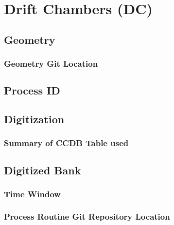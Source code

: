 \section{Drift Chambers (DC)}


\subsection{Geometry}

\subsubsection{Geometry Git Location}

\subsection{Process ID}

\subsection{Digitization}

\subsubsection{Summary of CCDB Table used}

\subsection{Digitized Bank}

\subsubsection{Time Window}

\subsubsection{Process Routine Git Repository Location}


